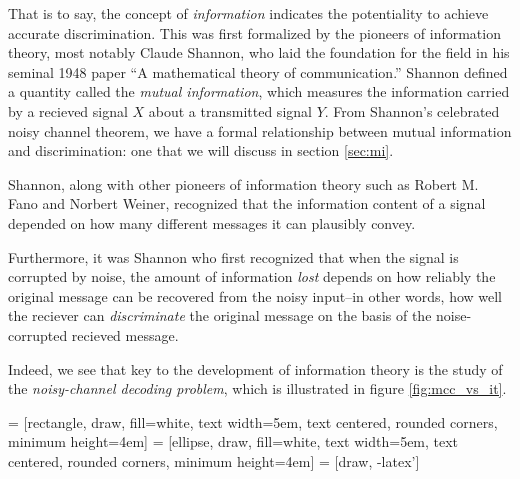 


That is to say, the concept of \emph{information} indicates the
potentiality to achieve accurate discrimination.  This was first
formalized by the pioneers of information theory, most notably Claude
Shannon, who laid the foundation for the field in his seminal 1948
paper ``A mathematical theory of communication.''  Shannon defined a
quantity called the \emph{mutual information}, which measures the
information carried by a recieved signal $X$ about a transmitted
signal $Y$.  From Shannon's celebrated noisy channel theorem, we have
a formal relationship between mutual information and discrimination:
one that we will discuss in section \ref{sec:mi}.


Shannon, along
with other pioneers of information theory such as Robert M. Fano and
Norbert Weiner, recognized that the information content of a signal
depended on how many different messages it can plausibly convey.



Furthermore, it was Shannon who first recognized that when the signal
is corrupted by noise, the amount of information \emph{lost} depends
on how reliably the original message can be recovered from the noisy
input--in other words, how well the reciever can \emph{discriminate}
the original message on the basis of the noise-corrupted recieved
message.  %

Indeed, we see that key to the development of information theory is
the study of the \emph{noisy-channel decoding problem}, which is
illustrated in figure \ref{fig:mcc_vs_it}.  %

 = [rectangle, draw, fill=white, 
    text width=5em, text centered, rounded corners, minimum height=4em]
 = [ellipse, draw, fill=white, 
    text width=5em, text centered, rounded corners, minimum height=4em]
 = [draw, -latex']
    
